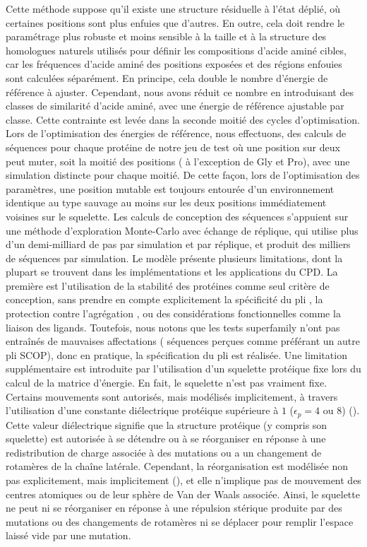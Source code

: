 Cette méthode suppose qu'il existe une structure résiduelle à l'état déplié, où certaines positions sont plus enfuies que d'autres. En outre, cela doit rendre le paramétrage plus robuste et moins sensible à la taille et à la structure des homologues naturels utilisés pour définir les compositions d'acide aminé cibles, car les fréquences d'acide aminé des positions exposées et des régions enfouies sont calculées séparément. En principe, cela double le nombre d'énergie de référence à ajuster. Cependant, nous avons réduit ce nombre en introduisant des classes de similarité d'acide aminé, avec une énergie de référence ajustable par classe. Cette contrainte est levée dans la seconde moitié des cycles d'optimisation. Lors de l'optimisation des énergies de référence, nous effectuons, des calculs de séquences pour chaque protéine de notre jeu de test où une position sur deux  peut muter, soit la moitié des positions ( à l'exception de Gly et Pro), avec une simulation distincte pour chaque moitié. De cette façon, lors de l'optimisation des paramètres, une position mutable est toujours entourée d'un environnement  identique au type sauvage au moins sur les deux positions immédiatement voisines sur le squelette. Les calculs de conception des séquences s'appuient sur une méthode d'exploration Monte-Carlo avec échange de réplique, qui utilise plus d'un demi-milliard de pas par simulation et par réplique, et produit des milliers de séquences par simulation.
Le modèle présente plusieurs limitations, dont la plupart se trouvent dans les implémentations et les applications du CPD. La première est l'utilisation de la stabilité des protéines comme seul critère de conception, sans prendre en compte explicitement la spécificité du pli \cite{Schmidt08,Simonson13}, la protection contre l'agrégation , ou des considérations fonctionnelles comme la liaison des ligands. Toutefois, nous notons que les tests superfamily n'ont pas entraînés de mauvaises affectations ( séquences perçues comme préférant un autre pli SCOP), donc en pratique, la spécification du pli est réalisée. Une limitation supplémentaire est introduite  par l'utilisation d'un squelette protéique fixe lors du calcul de la matrice d'énergie. En fait, le squelette n'est pas vraiment fixe. Certains mouvements sont autorisés, mais modélisés implicitement, à travers l'utilisation d'une constante diélectrique protéique supérieure à $1$ ($\epsilon_p= 4$ ou $8$) (\cite{Simonson13}). Cette valeur diélectrique signifie que la structure protéique (y compris son squelette) est autorisée à se détendre ou à se réorganiser en réponse à une redistribution de charge associée à des mutations ou a un changement de rotamères de la chaîne latérale. Cependant, la réorganisation est modélisée non pas explicitement, mais implicitement (\cite{Simonson13}), et elle n'implique pas de mouvement des centres atomiques ou de leur sphère de Van der Waals associée. Ainsi, le squelette ne peut ni se réorganiser en réponse à une répulsion stérique produite par des mutations ou des changements de rotamères ni se déplacer pour remplir l'espace laissé vide par une mutation.  
